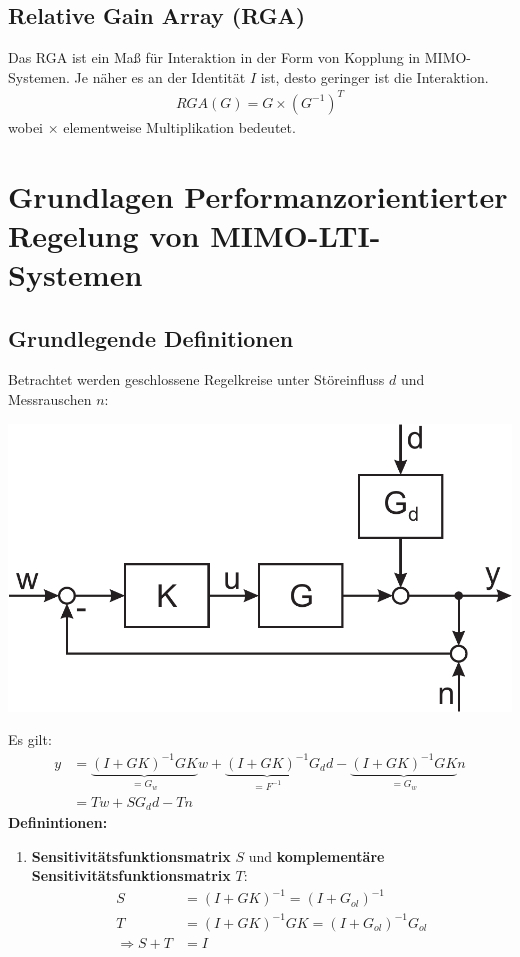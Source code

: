 \documentclass[a4paper,twocolumn,10pt]{article}
\begin{document}
\subsection{Relative Gain Array (RGA)}
Das RGA ist ein Maß für Interaktion in der Form von Kopplung in MIMO-Systemen. Je näher es an der Identität $I$ ist, desto geringer ist die Interaktion.
\begin{align*}
RGA(G)=G\times(G^{-1})^T
\end{align*}
wobei $\times$ elementweise Multiplikation bedeutet.

\section{Grundlagen Performanzorientierter Regelung von MIMO-LTI-Systemen}
\subsection{Grundlegende Definitionen}
Betrachtet werden geschlossene Regelkreise unter Störeinfluss $d$ und Messrauschen $n$:
\begin{center}
\includegraphics[width=0.8\columnwidth]{Grafiken/Blockdiagramm_Regelungssystem}
\end{center}
Es gilt:
\begin{align*}
y&=\underbrace{(I+GK)^{-1}GK}_{=G_w}w+\underbrace{(I+GK)^{-1}}_{=F^{-1}}G_dd-\underbrace{(I+GK)^{-1}GK}_{=G_w}n\\
&=Tw+SG_dd-Tn
\end{align*}
\textbf{Definintionen:}
\begin{enumerate}[label=$\bullet$]
\item \textbf{Sensitivitätsfunktionsmatrix} $S$ und \textbf{komplementäre Sensitivitätsfunktionsmatrix} $T$:
\begin{align*}
S&=(I+GK)^{-1}=(I+G_{ol})^{-1}\\
T&=(I+GK)^{-1}GK=(I+G_{ol})^{-1}G_{ol}\\
\Rightarrow S+T&=I
\end{align*}
\end{enumerate}
\end{document}

